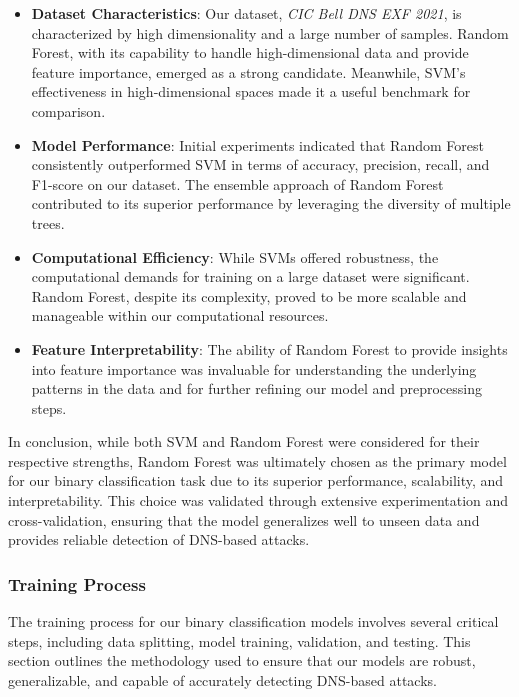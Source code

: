 \begin{itemize}
    \item \textbf{Dataset Characteristics}: Our dataset, \textit{CIC Bell DNS EXF 2021}, is characterized by high dimensionality and a large number of samples. Random Forest, with its capability to handle high-dimensional data and provide feature importance, emerged as a strong candidate. Meanwhile, SVM’s effectiveness in high-dimensional spaces made it a useful benchmark for comparison.
    \item \textbf{Model Performance}: Initial experiments indicated that Random Forest consistently outperformed SVM in terms of accuracy, precision, recall, and F1-score on our dataset. The ensemble approach of Random Forest contributed to its superior performance by leveraging the diversity of multiple trees.
    \item \textbf{Computational Efficiency}: While SVMs offered robustness, the computational demands for training on a large dataset were significant. Random Forest, despite its complexity, proved to be more scalable and manageable within our computational resources.
    \item \textbf{Feature Interpretability}: The ability of Random Forest to provide insights into feature importance was invaluable for understanding the underlying patterns in the data and for further refining our model and preprocessing steps.
\end{itemize}

In conclusion, while both SVM and Random Forest were considered for their respective strengths, Random Forest was ultimately chosen as the primary model for our binary classification task due to its superior performance, scalability, and interpretability. This choice was validated through extensive experimentation and cross-validation, ensuring that the model generalizes well to unseen data and provides reliable detection of DNS-based attacks.

\subsubsection{Training Process}

The training process for our binary classification models involves several critical steps, including data splitting, model training, validation, and testing. This section outlines the methodology used to ensure that our models are robust, generalizable, and capable of accurately detecting DNS-based attacks.

